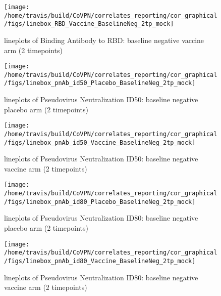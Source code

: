 \documentclass[]{book}
\theoremstyle{definition}
\theoremstyle{definition}
\theoremstyle{definition}
\newcommand{\1}{\mathbbm{1}}
\begin{document}
\clearpage
\begin{figure}[H]

{\centering \texttt{[image: /home/travis/build/CoVPN/correlates\_reporting/cor\_graphical/figs/linebox\_RBD\_Vaccine\_BaselineNeg\_2tp\_mock]} 

}

\caption{lineplots of Binding Antibody to RBD: baseline negative vaccine arm (2 timepoints)}\label{fig:unnamed-chunk-30}
\end{figure}

\clearpage
\begin{figure}[H]

{\centering \texttt{[image: /home/travis/build/CoVPN/correlates\_reporting/cor\_graphical/figs/linebox\_pnAb\_id50\_Placebo\_BaselineNeg\_2tp\_mock]} 

}

\caption{lineplots of Pseudovirus Neutralization ID50: baseline negative placebo arm (2 timepoints)}\label{fig:unnamed-chunk-31}
\end{figure}

\clearpage
\begin{figure}[H]

{\centering \texttt{[image: /home/travis/build/CoVPN/correlates\_reporting/cor\_graphical/figs/linebox\_pnAb\_id50\_Vaccine\_BaselineNeg\_2tp\_mock]} 

}

\caption{lineplots of Pseudovirus Neutralization ID50: baseline negative vaccine arm (2 timepoints)}\label{fig:unnamed-chunk-32}
\end{figure}

\clearpage
\begin{figure}[H]

{\centering \texttt{[image: /home/travis/build/CoVPN/correlates\_reporting/cor\_graphical/figs/linebox\_pnAb\_id80\_Placebo\_BaselineNeg\_2tp\_mock]} 

}

\caption{lineplots of Pseudovirus Neutralization ID80: baseline negative placebo arm (2 timepoints)}\label{fig:unnamed-chunk-33}
\end{figure}

\clearpage
\begin{figure}[H]

{\centering \texttt{[image: /home/travis/build/CoVPN/correlates\_reporting/cor\_graphical/figs/linebox\_pnAb\_id80\_Vaccine\_BaselineNeg\_2tp\_mock]} 

}

\caption{lineplots of Pseudovirus Neutralization ID80: baseline negative vaccine arm (2 timepoints)}\label{fig:unnamed-chunk-34}
\end{figure}
\end{document}
